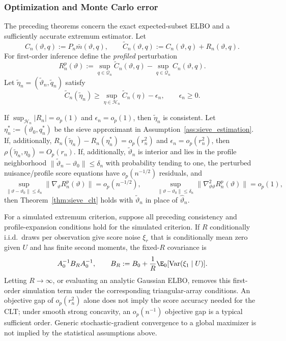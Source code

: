 \subsubsection{Optimization and Monte Carlo error}

The preceding theorems concern the exact expected-subset ELBO and a
sufficiently accurate extremum estimator.  Let
\[
 C_n(\vartheta,q):=P_n\bar m(\vartheta,q),\qquad
 \widetilde C_n(\vartheta,q):=C_n(\vartheta,q)+R_n(\vartheta,q).
\]
For first-order inference define the \emph{profiled} perturbation
\[
 R_n^p(\vartheta):=
 \sup_{q\in\mathcal Q_n}\widetilde C_n(\vartheta,q)
 -\sup_{q\in\mathcal Q_n}C_n(\vartheta,q).
\]
Let $\widetilde\eta_n=(\widetilde\vartheta_n,\widetilde q_n)$ satisfy
\[
 \widetilde C_n(\widetilde\eta_n)
 \ge \sup_{\eta\in\mathcal H_n}\widetilde C_n(\eta)-\epsilon_n,
 \qquad \epsilon_n\ge0.
\]

\begin{proposition}
\label{prop:algorithmic_remainders}
If $\sup_{\mathcal H_n}|R_n|=o_p(1)$ and $\epsilon_n=o_p(1)$, then
$\widetilde\eta_n$ is consistent.  Let
$\eta_n^*:=(\vartheta_0,q_n^*)$ be the sieve approximant in
Assumption~\ref{ass:sieve_estimation}.  If, additionally,
$R_n(\widetilde\eta_n)-R_n(\eta_n^*)=o_p(r_n^2)$ and
$\epsilon_n=o_p(r_n^2)$, then
$\rho(\widetilde\eta_n,\eta_0)=O_p(r_n)$.  If, additionally,
$\widetilde\vartheta_n$ is interior and lies in the profile neighborhood
$\|\widetilde\vartheta_n-\vartheta_0\|\le\delta_n$ with probability tending
to one, the perturbed nuisance/profile score equations have
$o_p(n^{-1/2})$ residuals, and
\[
 \sup_{\|\vartheta-\vartheta_0\|\le\delta_n}
 \|\nabla_\vartheta R_n^p(\vartheta)\|=o_p(n^{-1/2}),
 \qquad
 \sup_{\|\vartheta-\vartheta_0\|\le\delta_n}
 \|\nabla^2_{\vartheta\vartheta}R_n^p(\vartheta)\|=o_p(1),
\]
then Theorem~\ref{thm:sieve_clt} holds with
$\widetilde\vartheta_n$ in place of $\widehat\vartheta_n$.

For a simulated extremum criterion, suppose all preceding consistency and
profile-expansion conditions hold for the simulated criterion.  If $R$
conditionally i.i.d.\ draws per observation give score noise $\xi_r$ that is
conditionally mean zero given $U$ and has finite second moments, the fixed-$R$
covariance is
\[
 A_0^{-1}B_RA_0^{-1},\qquad
 B_R:=B_0+\frac1R\E_0[\mathrm{Var}(\xi_1\mid U)].
\]
Letting $R\to\infty$, or evaluating an analytic Gaussian ELBO, removes this
first-order simulation term under the corresponding triangular-array
conditions.  An objective gap of $o_p(r_n^2)$ alone does not imply the score
accuracy needed for the CLT; under smooth strong concavity, an
$o_p(n^{-1})$ objective gap is a typical sufficient order.  Generic
stochastic-gradient convergence to a global maximizer is not implied by the
statistical assumptions above.
\end{proposition}

